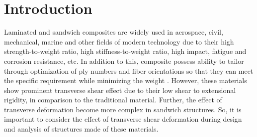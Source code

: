 \documentclass[3p,preprint,12pt]{elsarticle}
\begin{document}
\section{Introduction}
Laminated and sandwich composites are widely used in aerospace, civil, mechanical, marine and other fields of modern technology due to their high strength-to-weight ratio, high stiffness-to-weight ratio, high impact, fatigue and corrosion resistance, etc. In addition to this, composite possess ability to tailor through optimization of ply numbers and fiber orientations so that they can meet the specific requirement while minimizing the weight \cite{nikbakt2018review}. However,  these materials show prominent transverse shear effect due to their low shear to extensional rigidity, in comparison to the traditional material. Further, the effect of transverse deformation become more complex in sandwich structures.  So, it is important to consider the effect of transverse shear deformation during design and analysis of structures made of these materials.

\end{document}
